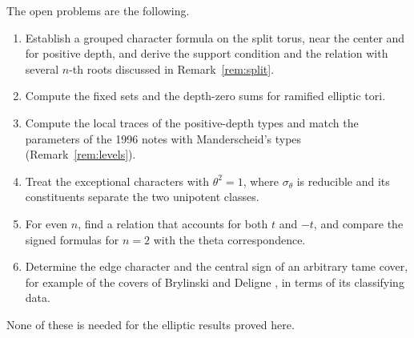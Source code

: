 \documentclass[12pt,letterpaper]{article}
\numberwithin{equation}{section}
\theoremstyle{definition}
\theoremstyle{remark}
\begin{document}
The open problems are the following.
\begin{enumerate}[leftmargin=2em]
\item Establish a grouped character formula on the split torus, near the center and for positive depth, and derive the support condition and the relation with several $n$-th roots discussed in Remark~\ref{rem:split}.
\item Compute the fixed sets and the depth-zero sums for ramified elliptic tori.
\item Compute the local traces of the positive-depth types and match the parameters of the 1996 notes with Manderscheid's types (Remark~\ref{rem:levels}).
\item Treat the exceptional characters with $\theta^2=1$, where $\sigma_\theta$ is reducible and its constituents separate the two unipotent classes.
\item For even $n$, find a relation that accounts for both $t$ and $-t$, and compare the signed formulas for $n=2$ with the theta correspondence.
\item Determine the edge character and the central sign of an arbitrary tame cover, for example of the covers of Brylinski and Deligne \cite{BD01}, in terms of its classifying data.
\end{enumerate}
None of these is needed for the elliptic results proved here.
\end{document}

